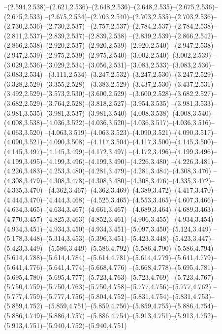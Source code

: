   --(2.594,2.538)--(2.621,2.536)--(2.648,2.536)--(2.648,2.535)--(2.675,2.536)--(2.675,2.533)%
  --(2.675,2.534)--(2.703,2.540)--(2.703,2.535)--(2.703,2.536)--(2.730,2.536)--(2.730,2.537)%
  --(2.757,2.537)--(2.784,2.537)--(2.784,2.538)--(2.811,2.537)--(2.839,2.537)--(2.839,2.538)%
  --(2.839,2.539)--(2.866,2.542)--(2.866,2.538)--(2.920,2.537)--(2.920,2.539)--(2.920,2.540)%
  --(2.947,2.538)--(2.947,2.539)--(2.975,2.539)--(2.975,2.540)--(3.002,2.540)--(3.002,2.539)%
  --(3.029,2.536)--(3.029,2.534)--(3.056,2.531)--(3.083,2.533)--(3.083,2.536)--(3.083,2.534)%
  --(3.111,2.534)--(3.247,2.532)--(3.247,2.530)--(3.247,2.529)--(3.328,2.529)--(3.355,2.528)%
  --(3.383,2.529)--(3.437,2.530)--(3.437,2.531)--(3.492,2.529)--(3.573,2.530)--(3.600,2.529)%
  --(3.600,2.528)--(3.682,2.527)--(3.682,2.529)--(3.764,2.528)--(3.818,2.527)--(3.954,3.535)%
  --(3.981,3.533)--(3.981,3.535)--(3.981,3.537)--(3.981,3.540)--(4.008,3.538)--(4.008,3.540)%
  --(4.008,3.538)--(4.036,3.522)--(4.036,3.520)--(4.036,3.517)--(4.036,3.516)--(4.063,3.520)%
  --(4.063,3.519)--(4.063,3.523)--(4.090,3.521)--(4.090,3.517)--(4.090,3.521)--(4.090,3.508)%
  --(4.117,3.504)--(4.117,3.500)--(4.145,3.500)--(4.145,3.497)--(4.145,3.499)--(4.172,3.497)%
  --(4.172,3.496)--(4.199,3.496)--(4.199,3.495)--(4.199,3.496)--(4.199,3.490)--(4.226,3.480)%
  --(4.226,3.481)--(4.226,3.483)--(4.253,3.480)--(4.281,3.479)--(4.281,3.484)--(4.308,3.476)%
  --(4.308,3.479)--(4.308,3.478)--(4.308,3.480)--(4.308,3.476)--(4.335,3.472)--(4.335,3.470)%
  --(4.362,3.467)--(4.362,3.469)--(4.389,3.472)--(4.417,3.470)--(4.444,3.470)--(4.444,3.468)%
  --(4.525,3.465)--(4.553,3.465)--(4.607,3.466)--(4.634,3.465)--(4.634,3.467)--(4.661,3.467)%
  --(4.689,3.464)--(4.689,3.463)--(4.770,3.457)--(4.825,3.463)--(4.852,3.461)--(4.906,3.455)%
  --(4.934,3.454)--(4.934,3.451)--(4.934,3.450)--(4.934,3.451)--(5.097,3.450)--(5.124,3.449)%
  --(5.178,3.448)--(5.314,3.453)--(5.396,3.451)--(5.423,3.448)--(5.423,3.447)--(5.423,3.449)%
  --(5.586,3.449)--(5.586,4.792)--(5.586,4.790)--(5.586,4.794)--(5.614,4.788)--(5.614,4.784)%
  --(5.614,4.781)--(5.614,4.779)--(5.641,4.779)--(5.641,4.776)--(5.641,4.774)--(5.668,4.776)%
  --(5.668,4.778)--(5.695,4.781)--(5.695,4.780)--(5.695,4.777)--(5.723,4.763)--(5.723,4.769)%
  --(5.723,4.767)--(5.750,4.759)--(5.750,4.763)--(5.750,4.758)--(5.777,4.756)--(5.777,4.762)%
  --(5.777,4.759)--(5.777,4.756)--(5.804,4.752)--(5.831,4.754)--(5.831,4.753)--(5.859,4.752)%
  --(5.859,4.751)--(5.859,4.756)--(5.859,4.755)--(5.886,4.754)--(5.886,4.749)--(5.886,4.757)%
  --(5.886,4.754)--(5.913,4.751)--(5.913,4.752)--(5.913,4.751)--(5.940,4.752)--(5.940,4.751)%
